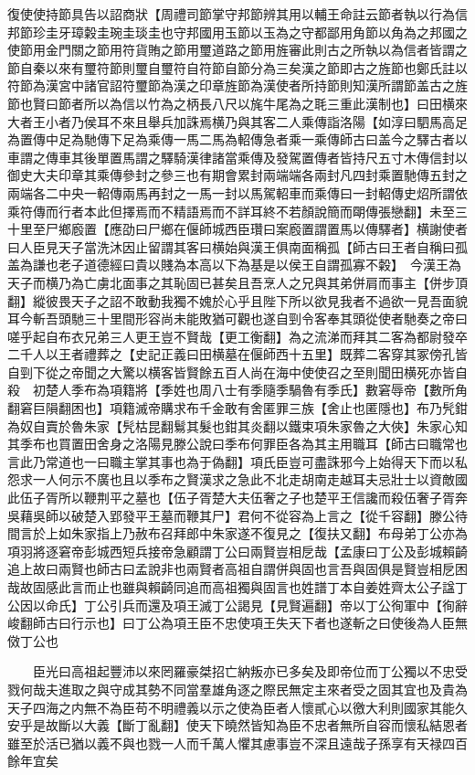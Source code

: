 復使使持節具告以詔商狀【周禮司節掌守邦節辨其用以輔王命註云節者執以行為信邦節珍圭牙璋糓圭琬圭琰圭也守邦國用玉節以玉為之守都鄙用角節以角為之邦國之使節用金門關之節用符貨賄之節用璽道路之節用旌審此則古之所執以為信者皆謂之節自秦以來有璽符節則璽自璽符自符節自節分為三矣漢之節即古之旌節也鄭氏註以符節為漢宮中諸官詔符璽節為漢之印章旌節為漢使者所持節則知漢所謂節盖古之旌節也賢曰節者所以為信以竹為之柄長八尺以旄牛尾為之毦三重此漢制也】曰田横來大者王小者乃侯耳不來且舉兵加誅焉横乃與其客二人乘傳詣洛陽【如淳曰駟馬高足為置傳中足為馳傳下足為乘傳一馬二馬為軺傳急者乘一乘傳師古曰盖今之驛古者以車謂之傳車其後單置馬謂之驛騎漢律諸當乘傳及發駕置傳者皆持尺五寸木傳信封以御史大夫印章其乘傳參封之參三也有期會累封兩端端各兩封凡四封乘置馳傳五封之兩端各二中央一軺傳兩馬再封之一馬一封以馬駕軺車而乘傳曰一封軺傳史炤所謂依乘符傳而行者本此但擇焉而不精語焉而不詳耳終不若顏說簡而朙傳張戀翻】未至三十里至尸鄉廏置【應劭曰尸鄉在偃師城西臣瓚曰案廏置謂置馬以傳驛者】横謝使者曰人臣見天子當洗沐因止留謂其客曰横始與漢王俱南面稱孤【師古曰王者自稱曰孤盖為謙也老子道德經曰貴以賤為本高以下為基是以侯王自謂孤寡不糓】　今漢王為天子而横乃為亡虜北面事之其恥固已甚矣且吾烹人之兄與其弟併肩而事主【併步頂翻】縱彼畏天子之詔不敢動我獨不媿於心乎且陛下所以欲見我者不過欲一見吾面貌耳今斬吾頭馳三十里間形容尚未能敗猶可觀也遂自剄令客奉其頭從使者馳奏之帝曰嗟乎起自布衣兄弟三人更王豈不賢哉【更工衡翻】為之流涕而拜其二客為都尉發卒二千人以王者禮葬之【史記正義曰田横墓在偃師西十五里】既葬二客穿其冢傍孔皆自剄下從之帝聞之大驚以横客皆賢餘五百人尚在海中使使召之至則聞田横死亦皆自殺　初楚人季布為項籍將【季姓也周八士有季隨季騧魯有季氏】數窘辱帝【數所角翻窘巨隕翻困也】項籍滅帝購求布千金敢有舍匿罪三族【舍止也匿隱也】布乃髠鉗為奴自賣於魯朱家【髠枯昆翻鬄其髮也鉗其炎翻以鐵束項朱家魯之大俠】朱家心知其季布也買置田舍身之洛陽見滕公說曰季布何罪臣各為其主用職耳【師古曰職常也言此乃常道也一曰職主掌其事也為于偽翻】項氏臣豈可盡誅邪今上始得天下而以私怨求一人何示不廣也且以季布之賢漢求之急此不北走胡南走越耳夫忌壯士以資敵國此伍子胥所以鞭荆平之墓也【伍子胥楚大夫伍奢之子也楚平王信讒而殺伍奢子胥奔吳藉吳師以破楚入郢發平王墓而鞭其尸】君何不從容為上言之【從千容翻】滕公待間言於上如朱家指上乃赦布召拜郎中朱家遂不復見之【復扶又翻】布母弟丁公亦為項羽將逐窘帝彭城西短兵接帝急顧謂丁公曰兩賢豈相戹哉【孟康曰丁公及彭城賴齮追上故曰兩賢也師古曰孟說非也兩賢者高祖自謂併與固也言吾與固俱是賢豈相戹困哉故固感此言而止也雖與賴齮同追而高祖獨與固言也姓譜丁本自姜姓齊太公子諡丁公因以命氏】丁公引兵而還及項王滅丁公謁見【見賢遍翻】帝以丁公徇軍中【徇辭峻翻師古曰行示也】曰丁公為項王臣不忠使項王失天下者也遂斬之曰使後為人臣無傚丁公也

　　臣光曰高祖起豐沛以來罔羅豪桀招亡納叛亦已多矣及即帝位而丁公獨以不忠受戮何哉夫進取之與守成其勢不同當羣雄角逐之際民無定主來者受之固其宜也及貴為天子四海之内無不為臣苟不明禮義以示之使為臣者人懷貳心以徼大利則國家其能久安乎是故斷以大義【斷丁亂翻】使天下曉然皆知為臣不忠者無所自容而懷私結恩者雖至於活已猶以義不與也戮一人而千萬人懼其慮事豈不深且遠哉子孫享有天禄四百餘年宜矣

